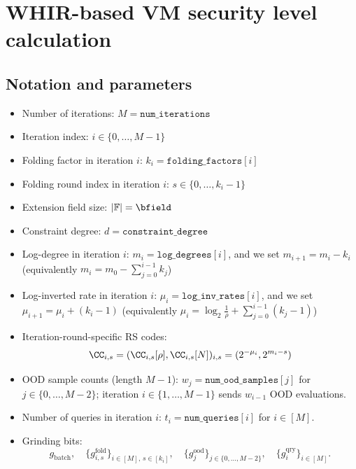 \newpage

\section{WHIR-based VM security level calculation}\label{sec:whir_security_level}




\subsection{Notation and parameters}\label{sec:whir_notation}

\begin{itemize}
  \item Number of iterations: \(M = \texttt{num\_iterations}\)
  \item Iteration index: \(i \in \{0,\dots,M-1\}\)
  \item Folding factor in iteration \(i\): \(k_i = \texttt{folding\_factors}[i]\)
  \item Folding round index in iteration \(i\): \(s \in \{0,\dots,k_i-1\}\)
  \item Extension field size: \(|\mathbb{F}| = \bfield\)
  \item Constraint degree: \(d = \texttt{constraint\_degree}\)
  \item Log-degree in iteration \(i\): \(m_i = \texttt{log\_degrees}[i]\), and we set $m_{i+1} = m_i - k_i$ (equivalently $m_i = m_0 - \sum_{j=0}^{i-1} k_j$)
  \item Log-inverted rate in iteration \(i\): \(\mu_i = \texttt{log\_inv\_rates}[i]\), and we set $\mu_{i+1} = \mu_i + (k_i - 1)$ (equivalently $\mu_i = \log_2 \frac{1}{\rho} + \sum_{j=0}^{i-1}(k_j - 1)$)
  \item Iteration-round-specific RS codes:
  $$
  \CC_{i,s}=(\CC_{i,s}[\rho],\CC_{i,s}[N])_{i,s}=(2^{-\mu_i},2^{m_i-s})
  $$
  \item OOD sample counts (length \(M-1\)): \(w_j = \texttt{num\_ood\_samples}[j]\) for \(j\in\{0,\ldots,M-2\}\); iteration \(i\in\{1,\ldots,M-1\}\) sends \(w_{i-1}\) OOD evaluations.
  \item Number of queries in iteration \(i\): \(t_i = \texttt{num\_queries}[i]\) for \(i\in[M]\).
  \item Grinding bits:
    \[
      g_{\mathrm{batch}},\quad
      \{g^{\mathrm{fold}}_{i,s}\}_{i\in [M],\,s\in[k_i]},\quad
      \{g^{\mathrm{ood}}_j\}_{j\in\{0,\ldots,M-2\}},\quad
      \{g^{\mathrm{qry}}_i\}_{i\in[M]}.
    \]
\end{itemize}



